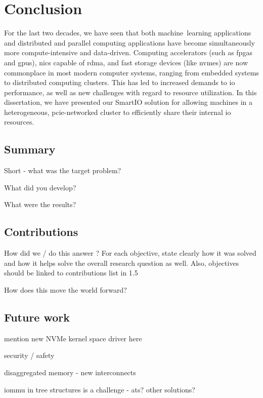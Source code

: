 \chapter{Conclusion}\label{chapter:conclusion}
For the last two decades, we have seen that both machine~learning applications and distributed and parallel computing applications have become simultaneously more compute-intensive and data-driven.
%
Computing accelerators (such as \glspl{fpga} and \glspl{gpu}), \glspl{nic} capable of \gls{rdma}, and fast storage devices (like \glspl{nvme}) are now commonplace in most modern computer systems, ranging from embedded systems to distributed computing clusters.
%
This has led to increased demands to \gls{io} performance, as well as new challenges with regard to resource utilization.
%
In this dissertation, we have presented our SmartIO solution for allowing machines in a heterogeneous, \gls{pcie}-networked cluster to efficiently share their internal \gls{io} resources.



\section{Summary}
Short - what was the target problem?


What did you develop?

What were the results?


\section{Contributions}\label{sec:concl}

How did we / do this answer ?
For each objective, state clearly how it was solved and how it helps solve the overall research question as well.
%
Also, objectives should be linked to contributions list in 1.5

How does this move the world forward?

\section{Future work}\label{sec:fw}

mention new NVMe kernel space driver here

security / safety

disaggregated memory - new interconnects

iommu in tree structures is a challenge - ats? other solutions?


